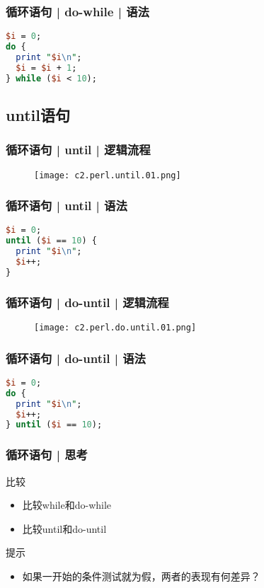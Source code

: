 \begin{frame}[fragile]
  \frametitle{循环语句 | do-while | 语法}
\begin{lstlisting}[language=Perl]
$i = 0;
do {
  print "$i\n";
  $i = $i + 1;
} while ($i < 10);
\end{lstlisting}
\end{frame}

\subsection{until语句}
\begin{frame}
  \frametitle{循环语句 | until | 逻辑流程}
  \begin{figure}
    \centering
    \texttt{[image: c2.perl.until.01.png]}
  \end{figure}
\end{frame}

\begin{frame}[fragile]
  \frametitle{循环语句 | until | \alert{语法}}
\begin{lstlisting}[language=Perl]
$i = 0;
until ($i == 10) {
  print "$i\n";
  $i++;
}
\end{lstlisting}
\end{frame}

\begin{frame}
  \frametitle{循环语句 | do-until | 逻辑流程}
  \begin{figure}
    \centering
    \texttt{[image: c2.perl.do.until.01.png]}
  \end{figure}
\end{frame}

\begin{frame}[fragile]
  \frametitle{循环语句 | do-until | 语法}
\begin{lstlisting}[language=Perl]
$i = 0;
do {
  print "$i\n";
  $i++;
} until ($i == 10);
\end{lstlisting}
\end{frame}

\begin{frame}
  \frametitle{循环语句 | 思考}
  \begin{block}{比较}
    \begin{itemize}
      \item 比较while和do-while
      \item 比较until和do-until
    \end{itemize}
  \end{block}
  \pause
  \begin{block}{提示}
    \begin{itemize}
      \item 如果一开始的条件测试就为假，两者的表现有何差异？
    \end{itemize}
  \end{block}
\end{frame}

